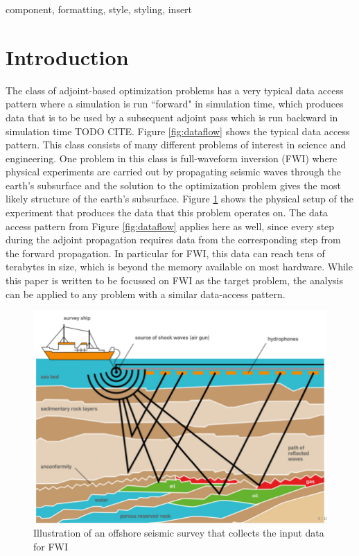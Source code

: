 \documentclass[conference]{IEEEtran}
\begin{document}
\begin{IEEEkeywords}
component, formatting, style, styling, insert
\end{IEEEkeywords}

\section{Introduction}
The class of adjoint-based optimization problems has a very typical data access pattern where a
simulation is run ``forward" in simulation time, which produces data that is to be used by a
subsequent adjoint pass which is run backward in simulation time TODO CITE. Figure \ref{fig:dataflow}
shows the typical data access pattern. This class consists of many different problems of interest in
science and engineering. One problem in this class is full-waveform inversion (FWI) where physical
experiments are carried out by propagating seismic waves through the earth's subsurface and the
solution to the optimization problem gives the most likely structure of the earth's subsurface. Figure
\ref{fig:offshore_survey} shows the physical setup of the experiment that produces the data that this problem operates
on. The data access pattern from Figure \ref{fig:dataflow} applies here as well, since every step during the
adjoint propagation requires data from the corresponding step from the forward propagation. In
particular for FWI, this data can reach tens of terabytes in size, which is beyond the memory
available on most hardware. While this paper is written to be focussed on FWI as the target problem, 
the analysis can be applied to any problem with a similar data-access pattern. 

\begin{figure}
\begin{center}
\includegraphics[width=0.8\linewidth]{images/survey-ship-diagram.png}
\end{center}
\caption{Illustration of an offshore seismic survey that collects the input data for FWI}
\label{fig:offshore_survey}
\end{figure}
\end{document}
